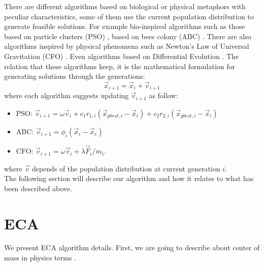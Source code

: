 \documentclass[graybox]{svmult}
\begin{document}
There are different algorithms based on biological or physical metaphors with peculiar characteristics, some of them use the current population distribution to generate feasible solutions. For example bio-inspired algorithms such as those based on particle clusters (PSO) \cite{pso1995}, based on bees colony (ABC) \cite{abc2005}. There are also algorithms inspired by physical phenomena such as Newton's Law of Universal Gravitation (CFO) \cite{fisicaSurvey, cfo2007}. Even algorithms based on Differential Evolution  \cite{jso2017, ed1995}. The relation that these algorithms keep, it is the mathematical formulation for generating solutions through the generations:
%
\begin{equation}
	\vec{x}_{i + 1} = \vec{x}_{i} + \vec{v}_{i + 1}
	\label{eqn:xxv}
\end{equation}
%
where each algorithm suggests updating $\vec{v}_{i+1} $ as follow:
\begin{itemize}
	\item PSO: $\vec{v}_{i + 1} = \omega \vec{v}_{i} +  
					c_1 r_{1, i} ( \vec{x}_{pbest, i} - \vec{x}_i ) + 
					c_2 r_{2, i} ( \vec{x}_{gbest, i} - \vec{x}_i )$
	\item ABC: $\vec{v}_{i + 1} = \phi_i (\vec{x}_i - \vec{x}_{r}) $
	\item CFO: $\vec{v}_{i + 1} = \omega \vec{v}_{i} + {\lambda \vec{F}_{i}} / {m_i} $.
\end{itemize}
%
%
where $\vec{v}$  depends of the population distribution at current generation $i$.\\

The following section will describe our algorithm and how it relates to what has been described above.

\section{ECA} %
\label{sec:eca}
%
%
We present ECA algorithm details. First, we are going to describe about center of mass in physics terms \cite{kleppner73,serway}.
\end{document}
